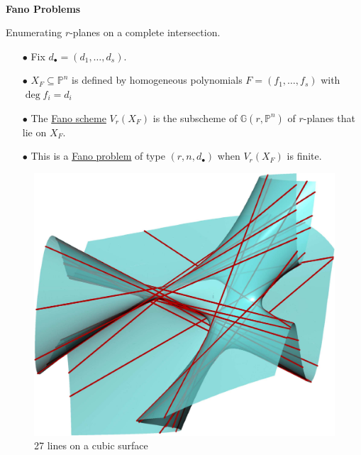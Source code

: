 \documentclass[final]{beamer}
\theoremstyle{thrm}
\newcommand{\blue}[1]{{\color{black!15!aggiemaroon}\underline{#1}}}
\newcommand{\headft}[1]{
\begin{center}
{\color{aggiemaroon}\textbf{\quad\LARGE{#1}\quad}}
\end{center}
}
\newcommand{\tallminipage}{\begin{minipage}{.025\textwidth}~\vspace{0pt}~\end{minipage}}
\begin{document}
\begin{frame}
\vspace{.6cm}

\tallminipage
\begin{minipage}[t]{.3\textwidth}
\headft{Fano Problems}
Enumerating $r$-planes on a complete intersection.
\begin{enumerate}
\item[$\bullet$] Fix $d_\bullet = (d_1,\dotsc,d_s)$.
\item[$\bullet$] $X_F\subseteq\mathbb{P}^n$ is defined by homogeneous polynomials $F=(f_1,\dotsc,f_s)$ with $\deg f_i = d_i$

\item[$\bullet$] The \blue{Fano scheme} $V_r(X_F)$ is the subscheme of $\mathbb{G}(r,\mathbb{P}^n)$ of $r$-planes that lie on $X_F$.

\item[$\bullet$] This is a \blue{Fano problem} of type $(r,n,d_\bullet)$ when $V_r(X_F)$ is finite.
\end{enumerate}

\vspace{-.3cm}

\begin{center}
\begin{figure}[27lines]
\includegraphics[scale=.7]{figures/27lines.pdf}
\caption{27 lines on a cubic surface}
\end{figure}
\end{center}


\end{minipage}
\end{frame}
\end{document}

